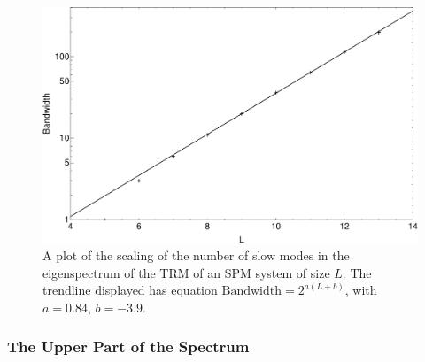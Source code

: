  \begin{figure}[h!]
 \caption[A graph of the scaling of the number of slow modes with system size.]{\label{fig:bandWidthScaling} 
 A plot of the scaling of the number of slow modes in the eigenspectrum of the TRM of
 an SPM system of size $L$. The trendline displayed has equation
 $ \mathrm{Bandwidth} = 2^{a(L+b)}$, with $a=0.84$, $b=-3.9$.
 }
  \begin{center}
 \includegraphics[width=1.0\textwidth]{TRM/images/bandWidth}
  \end{center}
\end{figure}

\subsubsection{The Upper Part of the Spectrum}


